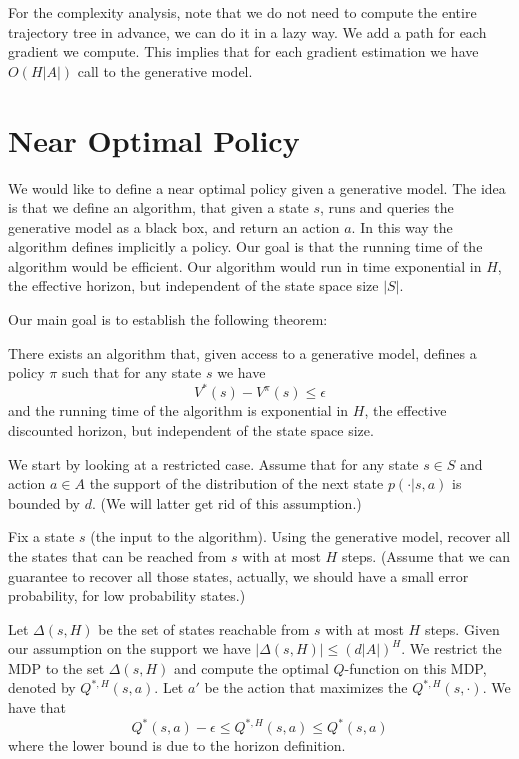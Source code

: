 For the complexity analysis, note that we do not need to compute the
entire trajectory tree in advance, we can do it in a lazy way. We
add a path for each gradient we compute. This implies that for each
gradient estimation we have $O(H|A|)$ call to the generative model.

\section{Near Optimal Policy}

We would like to define a near optimal policy given a generative
model. The idea is that we define an algorithm, that given a state
$s$, runs and queries the generative model as a black box, and
return an action $a$. In this way the algorithm defines implicitly a
policy. Our goal is that the running time of the algorithm would be
efficient. Our algorithm would run in time exponential in $H$, the
effective horizon, but independent of the state space size $|S|$.

Our main goal is to establish the following theorem:

\begin{theorem}
There exists an algorithm that,  given access to a generative model,
defines a policy $\pi$ such that for any state $s$ we have
\[
V^*(s)-V^\pi(s)\leq \epsilon
\]
and the running time of the algorithm is exponential in $H$, the
effective discounted horizon, but independent of the state space
size.
\end{theorem}

We start by looking at a restricted case. Assume that for any state
$s\in S$ and action $a\in A$ the support of the distribution of the
next state $p(\cdot|s,a)$ is bounded by $d$. (We will latter get rid
of this assumption.)

Fix a state $s$ (the input to the algorithm). Using the generative
model, recover all the states that can be reached from $s$ with at
most $H$ steps. (Assume that we can guarantee to recover all those
states, actually, we should have a small error probability, for low
probability states.)

Let $\Delta(s,H)$ be the set of states reachable from $s$ with at
most $H$ steps. Given our assumption on the support we have
$|\Delta(s,H)|\leq (d|A|)^H $. We restrict the MDP to the set
$\Delta(s,H)$ and compute the optimal $Q$-function on this MDP,
denoted by $Q^{*,H}(s,a)$. Let $a'$ be the action that maximizes the
$Q^{*,H}(s,\cdot)$. We have that
\[
Q^*(s,a)-\epsilon \leq Q^{*,H}(s,a)\leq Q^*(s,a)
\]
where the lower bound is due to the horizon definition.

